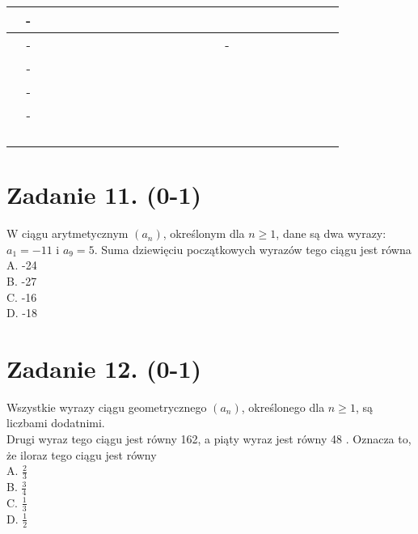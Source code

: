 \documentclass[10pt]{article}
\begin{document}
\begin{center}
\begin{tabular}{|c|c|c|c|c|c|c|c|c|c|c|c|c|c|c|c|c|c|c|c|c|c|c|c|c|}
\hline
 & - &  &  &  &  &  &  &  &  &  &  &  &  &  &  &  &  &  &  &  &  &  &  &  \\
\hline
 & - &  &  &  &  &  &  &  &  &  &  &  &  &  &  & - &  &  &  &  &  &  &  &  \\
\hline
 & - &  &  &  &  &  &  &  &  &  &  &  &  &  &  &  &  &  &  &  &  &  &  &  \\
\hline
 & - &  &  &  &  &  &  &  &  &  &  &  &  &  &  &  &  &  &  &  &  &  &  &  \\
\hline
 & - &  &  &  &  &  &  &  &  &  &  &  &  &  &  &  &  &  &  &  &  &  &  &  \\
\hline
 &  &  &  &  &  &  &  &  &  &  &  &  &  &  &  &  &  &  &  &  &  &  &  &  \\
\hline
 &  &  &  &  &  &  &  &  &  &  &  &  &  &  &  &  &  &  &  &  &  &  &  &  \\
\hline
 &  &  &  &  &  &  &  &  &  &  &  &  &  &  &  &  &  &  &  &  &  &  &  &  \\
\hline
 &  &  &  &  &  &  &  &  &  &  &  &  &  &  &  &  &  &  &  &  &  &  &  &  \\
\hline
\end{tabular}
\end{center}

\section*{Zadanie 11. (0-1)}
W ciągu arytmetycznym \(\left(a_{n}\right)\), określonym dla \(n \geq 1\), dane są dwa wyrazy: \(a_{1}=-11\) i \(a_{9}=5\). Suma dziewięciu początkowych wyrazów tego ciągu jest równa\\
A. -24\\
B. -27\\
C. -16\\
D. -18

\section*{Zadanie 12. (0-1)}
Wszystkie wyrazy ciągu geometrycznego \(\left(a_{n}\right)\), określonego dla \(n \geq 1\), są liczbami dodatnimi.\\
Drugi wyraz tego ciągu jest równy 162, a piąty wyraz jest równy 48 . Oznacza to, że iloraz tego ciągu jest równy\\
A. \(\frac{2}{3}\)\\
B. \(\frac{3}{4}\)\\
C. \(\frac{1}{3}\)\\
D. \(\frac{1}{2}\)
\end{document}
